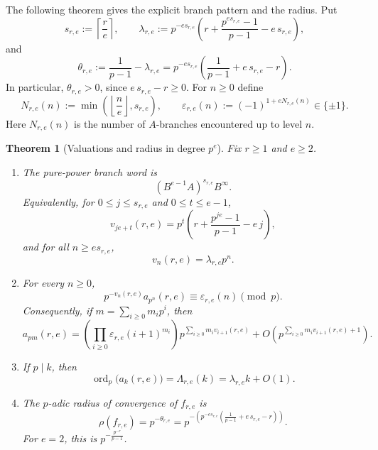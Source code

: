 \documentclass[11pt]{amsart}
\numberwithin{equation}{section}
\newtheorem{theorem}{Theorem}[section]
\DeclareMathOperator{\ordop}{ord}
\newcommand{\bigo}{O}
\newcommand{\vp}{\ordop_p}
\begin{document}
The following theorem gives the explicit branch pattern and the radius.  Put
\[
        s_{r,e}:=\left\lceil\frac r e\right\rceil,
        \qquad
        \lambda_{r,e}:=p^{-e s_{r,e}}
        \left(r+\frac{p^{e s_{r,e}}-1}{p-1}-e\,s_{r,e}\right),
\]
and
\[
        \theta_{r,e}:=\frac1{p-1}-\lambda_{r,e}
        =p^{-e s_{r,e}}\left(\frac1{p-1}+e\,s_{r,e}-r\right).
\]
In particular, $\theta_{r,e}>0$, since $e\,s_{r,e}-r\ge0$.
For $n\ge 0$ define
\[
        N_{r,e}(n):=\min\left(\left\lfloor\frac n e\right\rfloor,s_{r,e}\right),
        \qquad
        \varepsilon_{r,e}(n):=(-1)^{1+eN_{r,e}(n)}\in\{\pm1\}.
\]
Here $N_{r,e}(n)$ is the number of $A$-branches encountered up to level $n$.

\begin{theorem}[Valuations and radius in degree $p^e$]\label{thm:radius-pe}
Fix $r\ge 1$ and $e\ge 2$.
\begin{enumerate}[label=\textup{(\alph*)},leftmargin=2.2em]
\item The pure-power branch word is
\[
        (B^{e-1}A)^{s_{r,e}}B^\infty.
\]
Equivalently, for $0\le j\le s_{r,e}$ and $0\le t\le e-1$,
\[
        v_{je+t}(r,e)=p^t\left(r+\frac{p^{j e}-1}{p-1}-e\,j\right),
\]
and for all $n\ge es_{r,e}$,
\[
        v_n(r,e)=\lambda_{r,e}p^n.
\]
\item For every $n\ge 0$,
\[
        p^{-v_n(r,e)}a_{p^n}(r,e)\equiv \varepsilon_{r,e}(n)\pmod p.
\]
Consequently, if $m=\sum_{i\ge 0}m_ip^i$, then
\[
        a_{pm}(r,e)=
        \left(\prod_{i\ge 0}\varepsilon_{r,e}(i+1)^{m_i}\right)
        p^{\sum_{i\ge 0}m_i v_{i+1}(r,e)}
        +\bigo\!\left(p^{\sum_{i\ge 0}m_i v_{i+1}(r,e)+1}\right).
\]
\item If $p\mid k$, then
\[
        \vp\bigl(a_k(r,e)\bigr)=\Lambda_{r,e}(k)=\lambda_{r,e}k+\bigo(1).
\]
\item The $p$-adic radius of convergence of $f_{r,e}$ is
\[
        \rho(f_{r,e})=p^{-\theta_{r,e}}
        =p^{-\left(p^{-e s_{r,e}}\left(\frac1{p-1}+e\,s_{r,e}-r\right)\right)}.
\]
For $e=2$, this is $p^{-\frac{p^{-r}}{p-1}}$.
\end{enumerate}
\end{theorem}
\end{document}
